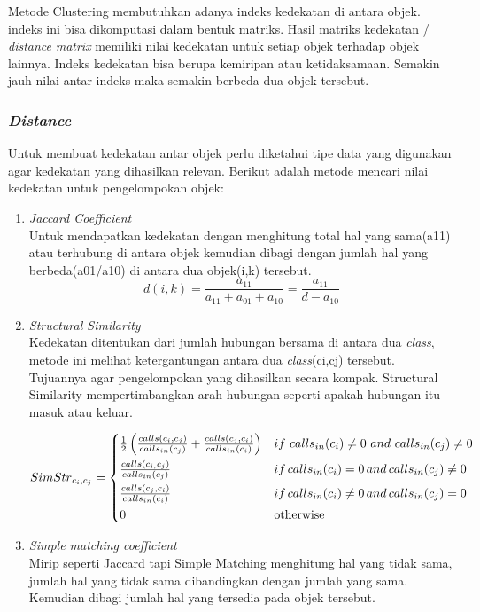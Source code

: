 Metode Clustering membutuhkan adanya indeks kedekatan di antara objek. indeks ini bisa dikomputasi dalam bentuk matriks. Hasil matriks kedekatan / \textit{distance} \textit{matrix} memiliki nilai kedekatan untuk setiap objek terhadap objek lainnya. Indeks kedekatan bisa berupa kemiripan atau ketidaksamaan. Semakin jauh nilai antar indeks maka semakin berbeda dua objek tersebut\cite{2C9}.

\subsubsection{\textit{Distance}}
Untuk membuat kedekatan antar objek perlu diketahui tipe data yang digunakan agar kedekatan yang dihasilkan relevan.  Berikut adalah metode mencari nilai kedekatan untuk pengelompokan objek:
\begin{enumerate}[leftmargin=1.3cm]
	\item \textit{Jaccard Coefficient} \cite{2C9} \\
	Untuk mendapatkan kedekatan dengan menghitung total hal yang sama(a{\tiny11}) atau terhubung di antara objek kemudian dibagi dengan jumlah hal yang berbeda(a{\tiny01}/a{\tiny10}) di antara dua objek(i,k) tersebut. 
	\begin{equation}
		d(i,k)={\frac{a_{11}}{a_{11}+a_{01}+a_{10}}}={\frac{a_{11}}{d-a_{10}}}
	\end{equation}
	\item \textit{Structural Similarity} \cite{ECD}  \\
	Kedekatan ditentukan dari jumlah hubungan bersama di antara dua \textit{class}, metode ini melihat ketergantungan antara dua \textit{class}(ci,cj) tersebut. Tujuannya agar pengelompokan yang dihasilkan secara kompak. Structural Similarity mempertimbangkan arah hubungan seperti apakah hubungan itu masuk atau keluar.

	\begin{equation}
		Sim{Str}_{c_{i},c_{j}} = \begin{cases*}
			\frac{1}{2}\left(\frac{c a l l s(c_{i},c_{j})}{c a l l s_{i n}(c_{j})}+\frac{c a l l s(c_{j},c_{i})}{c a l l s_{i n}(c_{i})}\right)  & $i f\,\,c a l l s_{i n}(c_{i})\neq0\,\, a n d\,\,c a l l s_{i n}(c_{j})\neq0$\\
			\frac{c alls(c_{i,}c_{j})}{c a l l s_{i n}(c_{j})}              
			& $i f\,c a l l s_{i n}(c_{i})=0\, a n d\,c a l l s_{i n}(c_{j})\neq0$ \\
			\frac{c a l l s(c_{j},c_{i})}{c a l l s_{i n}(c_{i})}              & $i f\,c a l l s_{i n}(c_{i})\neq0\, a n d\,c a l l s_{i n}(c_{j})=0$\\
		  0                    & otherwise
		\end{cases*}
	\end{equation}
	\item \textit{Simple matching coefficient} \cite{2C9} \\
	Mirip seperti Jaccard tapi Simple Matching menghitung hal yang tidak sama, jumlah hal yang tidak sama dibandingkan  dengan jumlah yang sama. Kemudian dibagi jumlah hal yang tersedia pada objek tersebut.	
\end{enumerate}	

